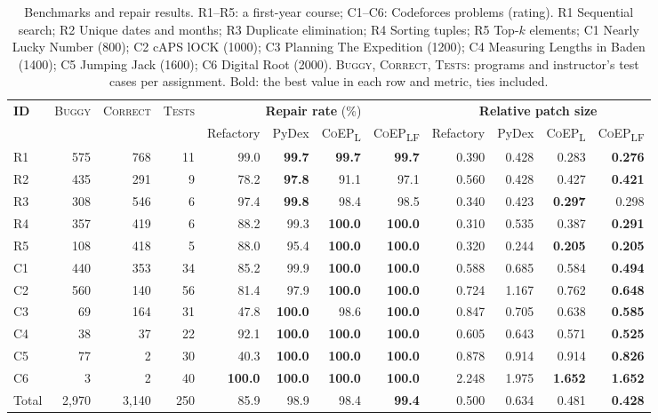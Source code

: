 \documentclass[acmsmall,screen,review,anonymous,nonacm]{acmart}
\newcommand{\coepL}{\textsc{CoEP}\textsubscript{L}\xspace}
\newcommand{\coepLF}{\textsc{CoEP}\textsubscript{LF}\xspace}
\begin{document}
\begin{table}[t]
\caption{Benchmarks and repair results. R1--R5: a first-year course; C1--C6: Codeforces problems (rating). R1 Sequential search; R2 Unique dates and months; R3 Duplicate elimination; R4 Sorting tuples; R5 Top-$k$ elements; C1 Nearly Lucky Number (800); C2 cAPS lOCK (1000); C3 Planning The Expedition (1200); C4 Measuring Lengths in Baden (1400); C5 Jumping Jack (1600); C6 Digital Root (2000). \textsc{Buggy}, \textsc{Correct}, \textsc{Tests}: programs and instructor's test cases per assignment. Bold: the best value in each row and metric, ties included.}
\label{tab:effect}
\centering
\footnotesize
\setlength{\tabcolsep}{4pt}
\begin{tabular}{l|rrr||rrrr||rrrr}
\toprule
\multirow{2}{*}{\textbf{ID}} & \multirow{2}{*}{\textsc{Buggy}} & \multirow{2}{*}{\textsc{Correct}} & \multirow{2}{*}{\textsc{Tests}} & \multicolumn{4}{c||}{\textbf{Repair rate} (\%)} & \multicolumn{4}{c}{\textbf{Relative patch size}} \\
\cline{5-12}
 & & & & Refactory & PyDex & \coepL & \coepLF & Refactory & PyDex & \coepL & \coepLF \\
\midrule\midrule
R1 & 575 & 768 & 11 & 99.0 & \textbf{99.7} & \textbf{99.7} & \textbf{99.7} & 0.390 & 0.428 & 0.283 & \textbf{0.276} \\
R2 & 435 & 291 & 9 & 78.2 & \textbf{97.8} & 91.1 & 97.1 & 0.560 & 0.428 & 0.427 & \textbf{0.421} \\
R3 & 308 & 546 & 6 & 97.4 & \textbf{99.8} & 98.4 & 98.5 & 0.340 & 0.423 & \textbf{0.297} & 0.298 \\
R4 & 357 & 419 & 6 & 88.2 & 99.3 & \textbf{100.0} & \textbf{100.0} & 0.310 & 0.535 & 0.387 & \textbf{0.291} \\
R5 & 108 & 418 & 5 & 88.0 & 95.4 & \textbf{100.0} & \textbf{100.0} & 0.320 & 0.244 & \textbf{0.205} & \textbf{0.205} \\
\midrule
C1 & 440 & 353 & 34 & 85.2 & 99.9 & \textbf{100.0} & \textbf{100.0} & 0.588 & 0.685 & 0.584 & \textbf{0.494} \\
C2 & 560 & 140 & 56 & 81.4 & 97.9 & \textbf{100.0} & \textbf{100.0} & 0.724 & 1.167 & 0.762 & \textbf{0.648} \\
C3 & 69 & 164 & 31 & 47.8 & \textbf{100.0} & 98.6 & \textbf{100.0} & 0.847 & 0.705 & 0.638 & \textbf{0.585} \\
C4 & 38 & 37 & 22 & 92.1 & \textbf{100.0} & \textbf{100.0} & \textbf{100.0} & 0.605 & 0.643 & 0.571 & \textbf{0.525} \\
C5 & 77 & 2 & 30 & 40.3 & \textbf{100.0} & \textbf{100.0} & \textbf{100.0} & 0.878 & 0.914 & 0.914 & \textbf{0.826} \\
C6 & 3 & 2 & 40 & \textbf{100.0} & \textbf{100.0} & \textbf{100.0} & \textbf{100.0} & 2.248 & 1.975 & \textbf{1.652} & \textbf{1.652} \\
\midrule
Total & 2,970 & 3,140 & 250 & 85.9 & 98.9 & 98.4 & \textbf{99.4} & 0.500 & 0.634 & 0.481 & \textbf{0.428} \\
\bottomrule
\end{tabular}
\end{table}
\end{document}
